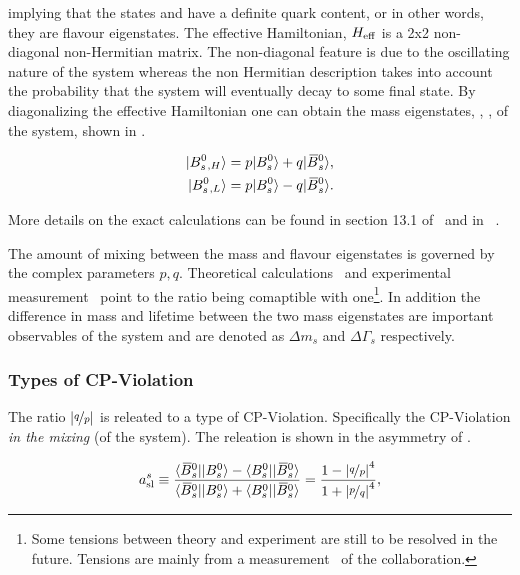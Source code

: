 \noindent implying that the states \Bs and \Bsb have a definite quark content, or in other words,
they are flavour eigenstates. The effective Hamiltonian, $H_{\rm eff}$ is a 2x2 non-diagonal non-Hermitian matrix.
The non-diagonal feature is due to the oscillating nature of the \BBbarSyst system whereas the non
Hermitian description takes into account the probability that the system will eventually decay to some final state.
By diagonalizing the effective Hamiltonian one can obtain the mass eigenstates, , ,
of the system, shown in .

\begin{align}
  \centering
  \ket{\Bs{}_{,H}} &= p \ket{\Bs} + q \ket{\Bsb}, \nonumber \\
  \ket{\Bs{}_{,L}} &= p \ket{\Bs} - q \ket{\Bsb}.
  \label{bs_mass_eigen}
\end{align}

More details on the exact calculations can be found in section 13.1 of~\cite{PDG} and in ~\cite{jeroenThesis,DeBruyn-thesis}.

The amount of mixing between the mass and flavour eigenstates is governed by the complex parameters $p,q$.
Theoretical calculations~\cite{Lenz:2011ti} and experimental measurement~\cite{asl-paper} point to the ratio
\qoverp being comaptible with one\footnote{Some tensions between theory and experiment are still to be resolved in the future.
Tensions are mainly from a measurement~\cite{Abazov:2013uma} of the \dzero collaboration.}.
In addition the difference in mass and lifetime between the two mass eigenstates are important observables of the
\BBbarSyst system and are denoted as $\Delta m_s$ and $\Delta\Gamma_s$ respectively.

\subsubsection{Types of CP-Violation}
The ratio $|\nicefrac{q}{p}|$ is releated to a type of CP-Violation. Specifically the CP-Violation {\it in the mixing} (of the \BBbarSyst system).
The releation is shown in the asymmetry of .

\begin{equation}
  \centering
  a_{\rm sl}^{s}  \equiv \frac{\bra{\Bsb}\ket{\Bs} - \bra{\Bs}\ket{\Bsb}} {\bra{\Bsb}\ket{\Bs} + \bra{\Bs}\ket{\Bsb}}
                       = \frac{1 - \left|\nicefrac{q}{p}\right|^4}{1 + \left|\nicefrac{p}{q}\right|^4},
  \label{acp_mixing}
\end{equation}

